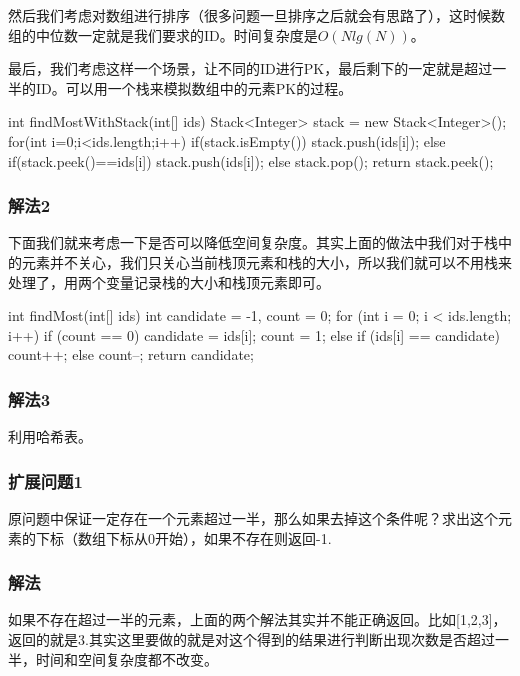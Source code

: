 然后我们考虑对数组进行排序（很多问题一旦排序之后就会有思路了），这时候数组的中位数一定就是我们要求的ID。时间复杂度是$O(Nlg(N))$。

最后，我们考虑这样一个场景，让不同的ID进行PK，最后剩下的一定就是超过一半的ID。可以用一个栈来模拟数组中的元素PK的过程。

\begin{Codex}[label={[$O(N)+O(N)$]Chap02_03_WaterKing.java}]
	int findMostWithStack(int[] ids) {
		Stack<Integer> stack = new Stack<Integer>();
		for(int i=0;i<ids.length;i++) {
			if(stack.isEmpty()) {
				stack.push(ids[i]);
			} else {
			if(stack.peek()==ids[i]) stack.push(ids[i]);
			else stack.pop();
		}
	}
	return stack.peek();
}
\end{Codex}

\subsubsection{解法2}
下面我们就来考虑一下是否可以降低空间复杂度。其实上面的做法中我们对于栈中的元素并不关心，我们只关心当前栈顶元素和栈的大小，所以我们就可以不用栈来处理了，用两个变量记录栈的大小和栈顶元素即可。

\begin{Codex}[label={[$O(N)+O(1)$]Chap02_03_WaterKing.java}]
	int findMost(int[] ids) {
		int candidate = -1, count = 0;
		for (int i = 0; i < ids.length; i++) {
			if (count == 0) {
				candidate = ids[i];
				count = 1;
			} else {
			if (ids[i] == candidate) count++;
			else count--;
		}
	}
	return candidate;
}
\end{Codex}

\subsubsection{解法3}
利用哈希表。


\subsubsection{扩展问题1}
原问题中保证一定存在一个元素超过一半，那么如果去掉这个条件呢？求出这个元素的下标（数组下标从0开始），如果不存在则返回-1.

\subsubsection{解法}
如果不存在超过一半的元素，上面的两个解法其实并不能正确返回。比如[1,2,3]，返回的就是3.其实这里要做的就是对这个得到的结果进行判断出现次数是否超过一半，时间和空间复杂度都不改变。

